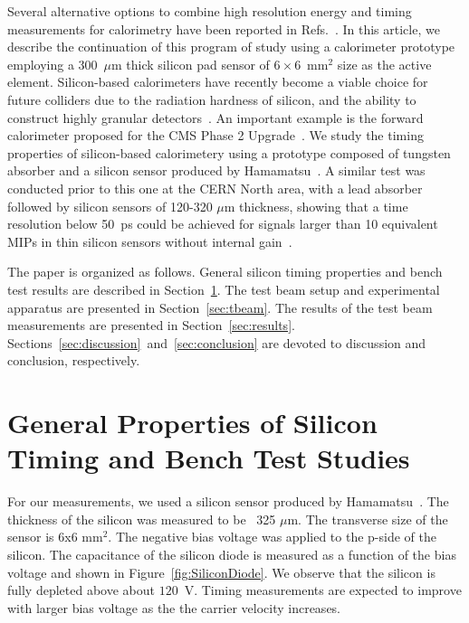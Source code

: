 \documentclass[preprint,1p]{elsarticle}
\begin{document}
Several alternative options to combine high resolution energy and timing
measurements for calorimetry have been reported in Refs.~\cite{Anderson:2015gha,
MCPFastCaloNIMA, Ronzhin2015288, Ronzhin201552, Brianza2015216}. In this
article, we describe the continuation of this program of study using a
calorimeter prototype employing a 300~$\mu$m thick silicon pad sensor of
$6\times 6$~mm$^2$ size as the active element. Silicon-based calorimeters have
recently become a viable choice for future colliders due to the radiation
hardness of silicon, and the ability to construct highly granular
detectors~\cite{Adloff:2011ha}. An important example is the forward calorimeter
proposed for the CMS Phase 2 Upgrade~\cite{Butler:2020886}. We study the timing
properties of silicon-based calorimetery using a prototype composed of tungsten
absorber and a silicon sensor produced by Hamamatsu~\cite{hamamatsu}. A similar
test was conducted prior to this one at the CERN North area, with a lead
absorber followed by silicon sensors of 120-320 $\mu$m thickness, showing that a
time resolution below 50~ps could be achieved for signals larger than 10
equivalent MIPs in thin silicon sensors without internal gain~\cite{akchurin}.

The paper is organized as follows. General silicon timing properties and bench
test results are described in Section~\ref{sec:siliconpad}. The test beam setup
and experimental apparatus are presented in Section~\ref{sec:tbeam}. The results
of the test beam measurements are presented in Section~\ref{sec:results}.
Sections~\ref{sec:discussion}~and~\ref{sec:conclusion} are devoted to discussion
and conclusion, respectively.

\section{General Properties of Silicon Timing and Bench Test Studies}
\label{sec:siliconpad}

For our measurements, we used a silicon sensor produced by
Hamamatsu~\cite{hamamatsu}. The thickness of the silicon was measured to be ~325
$\mu$m. The transverse size of the sensor is 6x6 mm$^2$. The negative bias
voltage was applied to the p-side of the silicon. The capacitance
of the silicon diode is measured as a function of the bias voltage
and shown in Figure~\ref{fig:SiliconDiode}. We observe that the silicon
is fully depleted above about $120$~V. Timing measurements are expected
to improve with larger bias voltage as the the carrier velocity increases.
\end{document}
